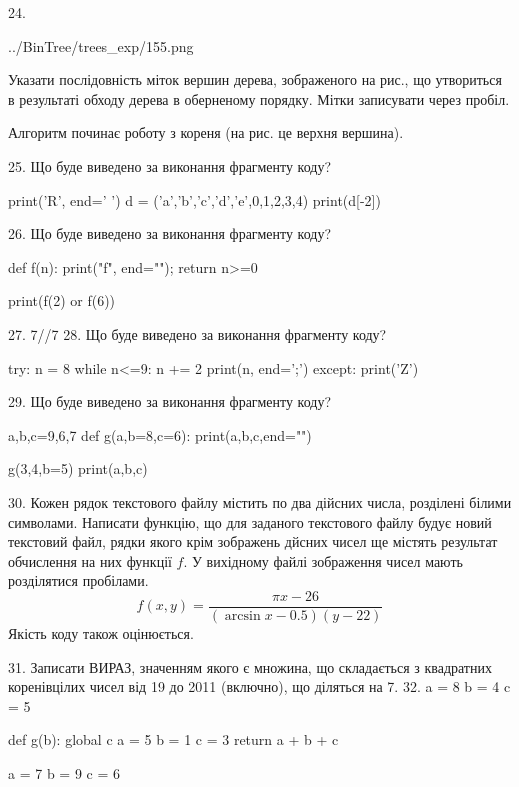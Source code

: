 \documentclass[11pt]{article}
\begin{document}
24. 

\begin{center}
	{../BinTree/trees_exp/155.png}
\end{center}
Указати послідовність міток вершин дерева, зображеного на рис., що утвориться в результаті обходу дерева в оберненому порядку. Мітки записувати через пробіл.\par Алгоритм починає роботу з кореня (на рис. це верхня вершина).

25. Що буде виведено за виконання фрагменту коду?

print('R', end=' ')
d = ('a','b','c','d','e',0,1,2,3,4)
print(d[-2])


26. Що буде виведено за виконання фрагменту коду?

def f(n):
    print("f", end="");
    return n>=0

print(f(2) or f(6))

27. 
7//7%
28. Що буде виведено за виконання фрагменту коду?

try:
    n = 8
    while n<=9:
        n += 2
    print(n, end=';')
except:
    print('Z')


29. Що буде виведено за виконання фрагменту коду?

a,b,c=9,6,7
def g(a,b=8,c=6):
    print(a,b,c,end="")

g(3,4,b=5)
print(a,b,c)


30. 
Кожен рядок текстового файлу містить по два дійсних числа, розділені білими символами.
Написати функцію, що для заданого текстового файлу будує новий текстовий файл, рядки якого крім зображень дйсних чисел ще містять результат обчислення на них функції $f$. У вихідному файлі зображення чисел мають розділятися пробілами. 
$$f(x, y) =\frac{\pi x - 26}{(\arcsin x - 0.5) (y - 22)}$$ 
Якість коду також оцінюється.


31. 
Записати ВИРАЗ, значенням якого є множина, що складається з квадратних коренівцілих чисел від 19 до 2011 (включно), що діляться на 7.
32. 
a = 8
b = 4
c = 5

def g(b):
global c    a = 5
    b = 1
    c = 3
    return a + b + c

a = 7
b = 9
c = 6
\end{document}
